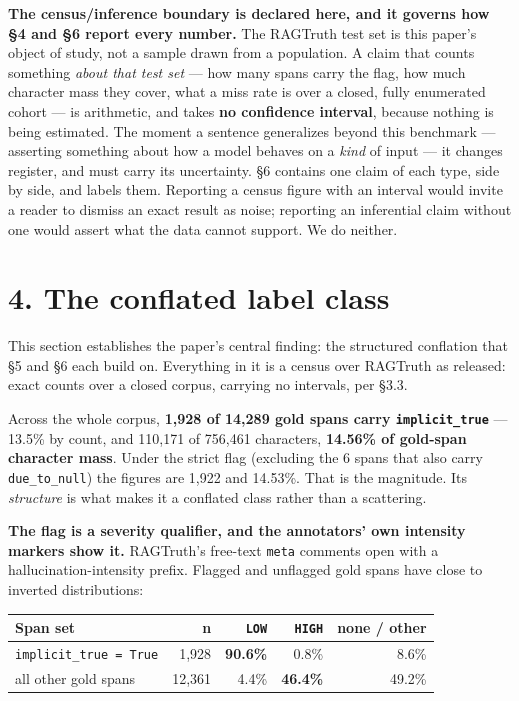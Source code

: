 \documentclass[11pt]{article}
\newcounter{none}
\begin{document}
\textbf{The census/inference boundary is declared here, and it governs how §4 and §6 report every
number.} The RAGTruth test set is this paper's object of study, not a sample drawn from a
population. A claim that counts something \emph{about that test set} --- how many spans carry the
flag, how much character mass they cover, what a miss rate is over a closed, fully
enumerated cohort --- is arithmetic, and takes \textbf{no confidence interval}, because nothing is
being estimated. The moment a sentence generalizes beyond this benchmark --- asserting
something about how a model behaves on a \emph{kind} of input --- it changes register, and must
carry its uncertainty. §6 contains one claim of each type, side by side, and labels them.
Reporting a census figure with an interval would invite a reader to dismiss an exact result
as noise; reporting an inferential claim without one would assert what the data cannot
support. We do neither.

\section{4. The conflated label class}\label{the-conflated-label-class}

This section establishes the paper's central finding: the structured conflation that §5 and
§6 each build on. Everything in it is a census over RAGTruth as released: exact counts over
a closed corpus, carrying no intervals, per §3.3.

Across the whole corpus, \textbf{1,928 of 14,289 gold spans carry \texttt{implicit\_true}} --- 13.5\% by
count, and 110,171 of 756,461 characters, \textbf{14.56\% of gold-span character mass}. Under the
strict flag (excluding the 6 spans that also carry \texttt{due\_to\_null}) the figures are 1,922 and
14.53\%. That is the magnitude. Its \emph{structure} is what makes it a conflated class rather
than a scattering.

\textbf{The flag is a severity qualifier, and the annotators' own intensity markers show it.}
RAGTruth's free-text \texttt{meta} comments open with a hallucination-intensity prefix. Flagged and
unflagged gold spans have close to inverted distributions:

{\def\LTcaptype{none} %
\begin{longtable}[]{@{}lrrrr@{}}
\toprule\noalign{}
Span set & n & \texttt{LOW} & \texttt{HIGH} & none / other \\
\midrule\noalign{}
\endhead
\bottomrule\noalign{}
\endlastfoot
\texttt{implicit\_true\ =\ True} & 1,928 & \textbf{90.6\%} & 0.8\% & 8.6\% \\
all other gold spans & 12,361 & 4.4\% & \textbf{46.4\%} & 49.2\% \\
\end{longtable}
}
\end{document}
